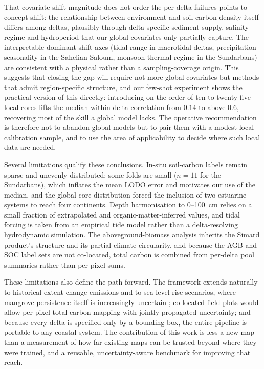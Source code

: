 \documentclass[11pt]{article}
\begin{document}
That covariate-shift magnitude does not order the per-delta failures points to concept
shift: the relationship between environment and soil-carbon density itself differs among
deltas, plausibly through delta-specific sediment supply, salinity regime and
hydroperiod that our global covariates only partially capture. The interpretable
dominant shift axes (tidal range in macrotidal deltas, precipitation seasonality in the
Sahelian Saloum, monsoon thermal regime in the Sundarbans) are consistent with a physical rather than a sampling-coverage origin. This suggests that closing the gap will
require not more global covariates but methods that admit region-specific structure, and our few-shot experiment shows the practical version of this directly: introducing on
the order of ten to twenty-five local cores lifts the median within-delta correlation
from $0.14$ to above $0.6$, recovering most of the skill a global model lacks. The
operative recommendation is therefore not to abandon global models but to pair them with
a modest local-calibration sample, and to use the area of applicability to decide where
such local data are needed.

Several limitations qualify these conclusions. In-situ soil-carbon labels remain sparse
and unevenly distributed: some folds are small ($n=11$ for the Sundarbans), which
inflates the mean LODO error and motivates our use of the median, and the global core
distribution forced the inclusion of two estuarine systems to reach four continents.
Depth harmonisation to 0--100~cm relies on a small fraction of extrapolated and
organic-matter-inferred values, and tidal forcing is taken from an empirical tide model
rather than a delta-resolving hydrodynamic simulation. The aboveground-biomass analysis
inherits the Simard product's structure and its partial climate circularity, and
because the AGB and SOC label sets are not co-located, total carbon is combined from
per-delta pool summaries rather than per-pixel sums.

These limitations also define the path forward. The framework extends naturally to
historical extent-change emissions and to sea-level-rise scenarios, where mangrove
persistence itself is increasingly uncertain \citep{lovelock2015,saintilan2020}; co-located
field plots would allow per-pixel total-carbon mapping with jointly propagated
uncertainty; and because every delta is specified only by a bounding box, the entire
pipeline is portable to any coastal system. The contribution of this work is less a new
map than a measurement of how far existing maps can be trusted beyond where they were trained, and a reusable, uncertainty-aware benchmark for improving that reach.
\end{document}
